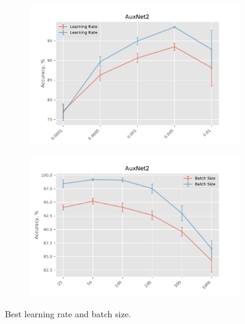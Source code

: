 \documentclass[10pt,conference,compsocconf]{IEEEtran}
\begin{document}
\begin{figure}
    \centering
    \begin{subfigure}[b]{0.475\textwidth}
        \centering
        \includegraphics[width=\textwidth]{learning_rates.pdf}
        \label{fig:learning_rates}
    \end{subfigure}
    \hfill
    \begin{subfigure}[b]{0.475\textwidth}  
        \centering 
        \includegraphics[width=\textwidth]{batch_sizes.pdf}
        \label{fig:batch_sizes}
    \end{subfigure}
    \caption[ Best learning rate and batch size. ]
    {\small Best learning rate and batch size.} 
    \label{fig:mean and std of nets}
\end{figure}



\end{document}
